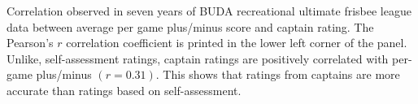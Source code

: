 Correlation observed in seven years of BUDA recreational ultimate frisbee league data between average per game plus/minus score and captain rating.  The Pearson's $r$ correlation coefficient is printed in the lower left corner of the panel. Unlike, self-assessment ratings, captain ratings are positively correlated with per-game plus/minus $(r = 0.31)$. This shows that ratings from captains are more accurate than ratings based on self-assessment. \label{fig:correlation_captain}